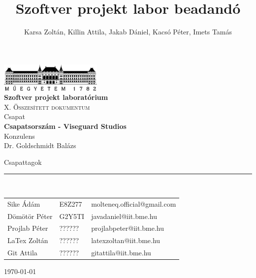 \documentclass[12pt, a4paper]{book}
\title{Szoftver projekt labor beadandó}
\author{Karsa Zoltán, Killin Attila, Jakab Dániel, Kacsó Péter, Imets Tamás}
\begin{document}
\begin{titlepage} 
	\begin{center}
		\includegraphics[width=5cm]{docs/img/BMElogo}\\ 
		\vspace{1cm}
		\LARGE{\bfseries{Szoftver projekt laboratórium}}\\
		\vspace{0.5cm}
		\Large\textsc{X. Összesített dokumentum}\\
		\vspace{1cm}
		\small{Csapat}\\
		\Large{\bfseries{Csapatsorszám - Viseguard Studios}}\\
		\vspace{1cm}
		\small{Konzulens}\\
		\Large{Dr. Goldschmidt Balázs}
	\end{center}
	\begin{flushleft}
		\vspace*{6cm}
		Csapattagok\\
		\vspace{-0.3cm}
		\rule{14cm}{0.5pt}\\
		\vspace{0.2cm}
		\begin{tabular}{l l l} %
			Sike Ádám & E8Z277 & molteneq.official@gmail.com \\
			Dömötör Péter & G2Y5TI & javadaniel@iit.bme.hu \\
			Projlab Péter & ?????? & projlabpeter@iit.bme.hu \\
			LaTex Zoltán  & ?????? & latexzoltan@iit.bme.hu \\
			Git Attila & ?????? & gitattila@iit.bme.hu \\
		\end{tabular}
	\end{flushleft}
	\begin{flushright}
		\vspace*{2cm}
		\today   %
	\end{flushright}
\end{titlepage}

\sloppy

\end{document}
